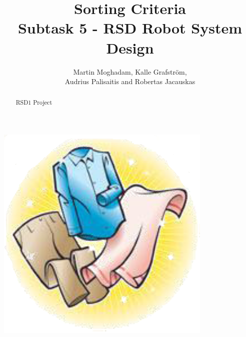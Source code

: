 \documentclass[a4paper, 11pt]{article}	%
\begin{document}
\begin{titlepage}
\title{\Huge \bfseries Sorting Criteria \vspace{3 mm}\\ \Large \normalfont Subtask 5 - RSD Robot System Design\vspace{10mm}}   %
\author{Martin Moghadam, Kalle Grafstr\"{o}m, \\ Audrius Palisaitis and Robertas Jacauskas}         %
\maketitle

\begin{center}
\includegraphics[scale=0.4]{frontPage}
\end{center}

\begin{abstract}
RSD1 Project
\end{abstract}

\end{titlepage}


\setcounter{page}{1}

\newpage
\tableofcontents
\newpage

\setcounter{page}{1}









\newpage




\nocite{bib1} 
\nocite{bib2}
\nocite{bib3}
\nocite{bib4}
\nocite{bib5}
\nocite{bib6}
\nocite{bib7}



\newpage

\end{document}
